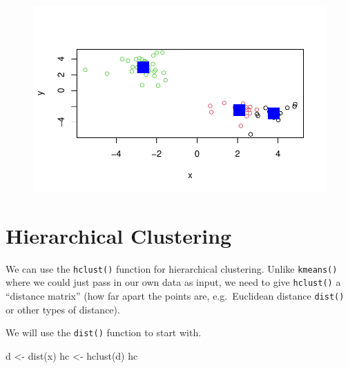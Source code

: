 \documentclass[
  letterpaper,
  DIV=11,
  numbers=noendperiod]{scrartcl}
\newenvironment{Shaded}{\begin{snugshade}}{\end{snugshade}}
\newcommand{\AttributeTok}[1]{\textcolor[rgb]{0.40,0.45,0.13}{#1}}
\newcommand{\DecValTok}[1]{\textcolor[rgb]{0.68,0.00,0.00}{#1}}
\newcommand{\FunctionTok}[1]{\textcolor[rgb]{0.28,0.35,0.67}{#1}}
\newcommand{\NormalTok}[1]{\textcolor[rgb]{0.00,0.23,0.31}{#1}}
\newcommand{\OtherTok}[1]{\textcolor[rgb]{0.00,0.23,0.31}{#1}}
\newcommand{\SpecialCharTok}[1]{\textcolor[rgb]{0.37,0.37,0.37}{#1}}
\newcommand{\StringTok}[1]{\textcolor[rgb]{0.13,0.47,0.30}{#1}}
\begin{document}
\begin{Shaded}
\end{Shaded}

\begin{figure}[H]

{\centering \includegraphics{Lab-7_files/figure-pdf/unnamed-chunk-10-1.pdf}

}

\end{figure}

\hypertarget{hierarchical-clustering}{%
\section{Hierarchical Clustering}\label{hierarchical-clustering}}

We can use the \texttt{hclust()} function for hierarchical clustering.
Unlike \texttt{kmeans()} where we could just pass in our own data as
input, we need to give \texttt{hclust()} a ``distance matrix'' (how far
apart the points are, e.g.~Euclidean distance \texttt{dist()} or other
types of distance).

We will use the \texttt{dist()} function to start with.

\begin{Shaded}
\begin{Highlighting}[]
\NormalTok{d }\OtherTok{\textless{}{-}} \FunctionTok{dist}\NormalTok{(x)}
\NormalTok{hc }\OtherTok{\textless{}{-}} \FunctionTok{hclust}\NormalTok{(d)}
\NormalTok{hc}
\end{Highlighting}
\end{Shaded}
\end{document}
